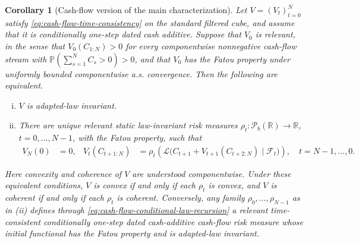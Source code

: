 \documentclass[a4paper]{amsart}
\newtheorem{corollary}[corollary]{Corollary}
\theoremstyle{definition}
\newcommand{\R}{\mathbb{R}}
\newcommand{\F}{\mathcal{F}}
\newcommand{\law}{\mathcal{L}}
\newcommand{\Pc}{\mathcal P}
\renewcommand{\P}{\mathbb{P}}
\begin{document}
\begin{corollary}[Cash-flow version of the main characterization]
\label{cor:cash-flow-main-characterization}
Let \(V=(V_t)_{t=0}^N\) satisfy
\eqref{eq:cash-flow-time-consistency} on the standard filtered cube, and
assume that it is conditionally one-step dated cash additive. Suppose that
\(V_0\) is relevant, in the sense that
\(V_0(C_{1:N})>0\) for every componentwise nonnegative cash-flow stream with
\(\P(\sum_{s=1}^N C_s>0)>0\), and that \(V_0\) has the Fatou property under
uniformly bounded componentwise a.s. convergence. Then the following are
equivalent.

\begin{enumerate}[(i)]
\item \(V\) is adapted-law invariant.

\item There are unique relevant static law-invariant risk measures
\(\rho_t:\Pc_b(\R)\to\R\), \(t=0,\dots,N-1\), with the Fatou property, such
that
\begin{align}
V_N(0)&=0,
&
V_t(C_{t+1:N})
&=
\rho_t\!\left(
\law\bigl(C_{t+1}+V_{t+1}(C_{t+2:N})\mid\F_t\bigr)
\right),
\quad t=N-1,\dots,0.
\label{eq:cash-flow-conditional-law-recursion}
\end{align}
\end{enumerate}

Here convexity and coherence of \(V\) are understood componentwise. Under
these equivalent conditions, \(V\) is convex if and only if each \(\rho_t\)
is convex, and \(V\) is coherent if and only if each \(\rho_t\) is coherent.
Conversely, any family \(\rho_0,\dots,\rho_{N-1}\) as in (ii)
defines through \eqref{eq:cash-flow-conditional-law-recursion} a relevant
time-consistent conditionally one-step dated cash-additive cash-flow risk
measure whose initial functional has the Fatou property and is adapted-law
invariant.
\end{corollary}
\end{document}
